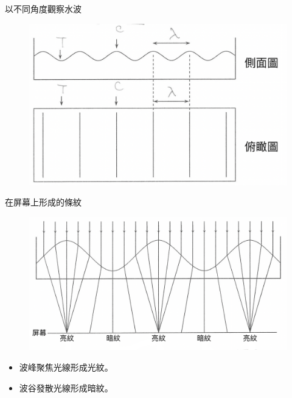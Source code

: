 \documentclass[13pt]{beamer}
\begin{document}
\begin{frame}{以不同角度觀察水波}
    \begin{figure}
        \centering
        \includegraphics[width=1\linewidth]{images/Screenshot 2023-09-25 at 2.33.31 AM.png}


    \end{figure}
\end{frame}


\begin{frame}{在屏幕上形成的條紋}
    \begin{figure}
        \centering
        \includegraphics[width=0.75\linewidth]{images/Screenshot 2023-09-26 at 9.55.36 PM.png}
    \end{figure}
    \begin{itemize}
        \item 波峰聚焦光線形成光紋。
        \item 波谷發散光線形成暗紋。
    \end{itemize}
\end{frame}
\end{document}
